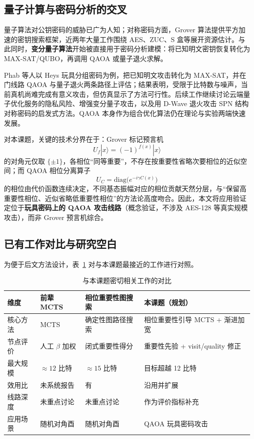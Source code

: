 \documentclass{HDU-Bachelor-Thesis}
\begin{document}
\subsection{量子计算与密码分析的交叉}

量子算法对公钥密码的威胁已广为人知\cite{shor1997}；对称密码方面，Grover 算法提供平方加速的密钥搜索框架\cite{grover1996}，近两年大量工作围绕 AES、ZUC、S 盒等展开资源估计。与此同时，\textbf{变分量子算法}开始被直接用于密码分析建模：将已知明文密钥恢复转化为 MAX-SAT/QUBO，再调用 QAOA 或量子退火求解。

Phab 等人以 Heys 玩具分组密码为例，把已知明文攻击转化为 MAX-SAT，并在门线路 QAOA 与量子退火两条路径上评估；结果表明，受限于比特数与噪声，当前真机尚难完成有意义攻击，但仿真显示了方法可行性\cite{heys-qaoa2023}。后续工作继续讨论云端量子优化服务的隐私风险\cite{trivium-privacy2025}、增强变分量子攻击\cite{enhanced-vqaa2025}，以及用 D-Wave 退火攻击 SPN 结构对称密码的启发式方法\cite{pei2025dwave}。QAOA 本身作为组合优化算法仍在理论与实验两端快速发展\cite{farhi2014qaoa,qaoa-near-symmetric2024}。

对本课题，关键的技术分界在于：Grover 标记预言机
\[
U_f|x\rangle=(-1)^{f(x)}|x\rangle
\]
的对角元仅取 $\{\pm 1\}$，各相位“同等重要”，不存在按重要性省略次要相位的近似空间；而 QAOA 相位分离算子
\[
U_C=\mathrm{diag}\bigl(e^{-i\gamma C(x)}\bigr)
\]
的相位由代价函数连续决定，不同基态振幅对应的相位贡献天然分层，与“保留高重要性相位、近似省略低重要性相位”的方法论高度吻合。因此，本文将应用验证定位于\textbf{玩具密码上的 QAOA 攻击线路}（概念验证，不涉及 AES-128 等真实规模攻击），而非 Grover 预言机综合。

\subsection{已有工作对比与研究空白}

为便于后文方法设计，表~\ref{tab:related-compare} 对与本课题最接近的工作进行对照。

\begin{table}[htbp]
  \centering
  \caption{与本课题密切相关工作的对比}
  \label{tab:related-compare}
  \begin{tabular}{p{2.6cm}p{3.2cm}p{3.2cm}p{3.2cm}}
    \toprule
    维度 & 前辈 MCTS\cite{nisq-mcts-thesis} & 相位重要性图搜索\cite{zhang2024approximate} & 本课题（规划） \\
    \midrule
    核心方法 & MCTS & 确定性图路径搜索 & 相位重要性引导 MCTS + 渐进加宽 \\
    节点评价 & 人工 $\beta$ 加权 & 闭式重要性得分 & 重要性先验 + visit/quality 修正 \\
    最大规模 & $\approx 12$ 比特 & $\approx 15$ 比特 & 目标超越 12 比特 \\
    效用比 & 未系统报告 & 有 & 沿用并扩展 \\
    线路深度 & 未重点讨论 & 未重点讨论 & 作为评价指标补充 \\
    应用场景 & 随机对角酉 & 随机对角酉 & QAOA 玩具密码攻击 \\
    \bottomrule
  \end{tabular}
\end{table}
\end{document}
